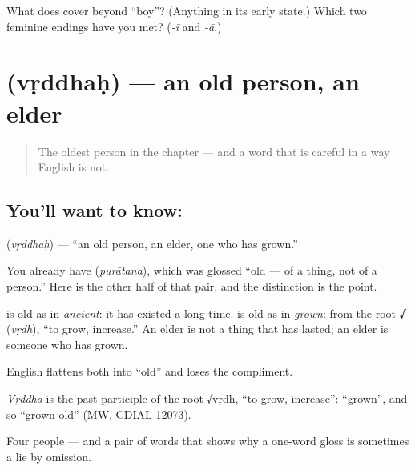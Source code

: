 \begin{tcolorbox}[breakable,colback=teal!4,colframe=teal!35!black,title={Before you move on}]
What does  cover beyond \textquotedblleft{}boy\textquotedblright{}? (Anything in its early state.) Which two feminine endings have you met? (\emph{-ī} and \emph{-ā}.)
\end{tcolorbox}
\section[\texorpdfstring{\sk{वृद्धः} (vṛddhaḥ)}{वृद्धः (vṛddhaḥ)}]{ (vṛddhaḥ) — an old person, an elder}

\label{lesson:SA-C20-old-person}



\begin{quote}
The oldest person in the chapter — and a word that is careful in a way English is not.
\end{quote}

\subsection*{You'll want to know: }
\textbf{} (\emph{vṛddhaḥ}) — \textquotedblleft{}an old person, an elder, one who has grown.\textquotedblright{}

You already have \textbf{} (\emph{purātana}), which was glossed \textquotedblleft{}old — of a thing, not of a person.\textquotedblright{} Here is the other half of that pair, and the distinction is the point.

\emph{} is old as in \emph{ancient}: it has existed a long time. \emph{} is old as in \emph{grown}: from the root \textbf{√} (\emph{vṛdh}), \textquotedblleft{}to grow, increase.\textquotedblright{} An elder is not a thing that has lasted; an elder is someone who has grown.

English flattens both into \textquotedblleft{}old\textquotedblright{} and loses the compliment.

\begin{cousinweb}
\emph{Vṛddha} is the past participle of the root √vṛdh, \textquotedblleft{}to grow, increase\textquotedblright{}: \textquotedblleft{}grown\textquotedblright{}, and so \textquotedblleft{}grown old\textquotedblright{} (MW, CDIAL 12073).
\end{cousinweb}

\begin{grammarlens}[title={What you've built}]
Four people — and a pair of words that shows why a one-word gloss is sometimes a lie by omission.
\end{grammarlens}

